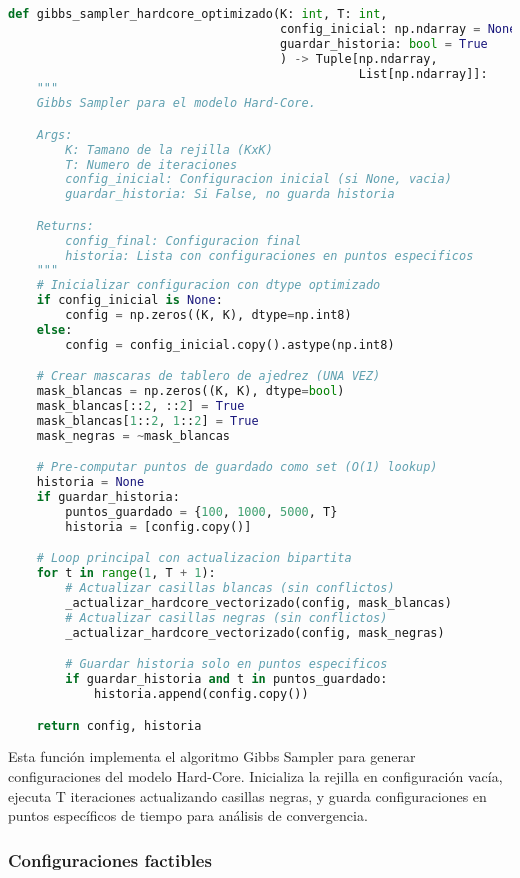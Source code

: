 \begin{lstlisting}[language=Python]
def gibbs_sampler_hardcore_optimizado(K: int, T: int,
                                      config_inicial: np.ndarray = None,
                                      guardar_historia: bool = True
                                      ) -> Tuple[np.ndarray,
                                                 List[np.ndarray]]:
    """
    Gibbs Sampler para el modelo Hard-Core.

    Args:
        K: Tamano de la rejilla (KxK)
        T: Numero de iteraciones
        config_inicial: Configuracion inicial (si None, vacia)
        guardar_historia: Si False, no guarda historia

    Returns:
        config_final: Configuracion final
        historia: Lista con configuraciones en puntos especificos
    """
    # Inicializar configuracion con dtype optimizado
    if config_inicial is None:
        config = np.zeros((K, K), dtype=np.int8)
    else:
        config = config_inicial.copy().astype(np.int8)

    # Crear mascaras de tablero de ajedrez (UNA VEZ)
    mask_blancas = np.zeros((K, K), dtype=bool)
    mask_blancas[::2, ::2] = True
    mask_blancas[1::2, 1::2] = True
    mask_negras = ~mask_blancas

    # Pre-computar puntos de guardado como set (O(1) lookup)
    historia = None
    if guardar_historia:
        puntos_guardado = {100, 1000, 5000, T}
        historia = [config.copy()]

    # Loop principal con actualizacion bipartita
    for t in range(1, T + 1):
        # Actualizar casillas blancas (sin conflictos)
        _actualizar_hardcore_vectorizado(config, mask_blancas)
        # Actualizar casillas negras (sin conflictos)
        _actualizar_hardcore_vectorizado(config, mask_negras)

        # Guardar historia solo en puntos especificos
        if guardar_historia and t in puntos_guardado:
            historia.append(config.copy())

    return config, historia
\end{lstlisting}

Esta función implementa el algoritmo Gibbs Sampler para generar configuraciones del modelo Hard-Core. Inicializa la rejilla en configuración vacía, ejecuta T iteraciones actualizando casillas negras, y guarda configuraciones en puntos específicos de tiempo para análisis de convergencia.

\subsubsection{Configuraciones factibles}

